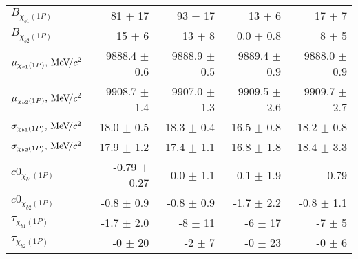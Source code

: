 \begin{table}[H]
{{\begin{tabular}{lrrrr}
\rule{0pt}{4ex}$B_{\chi_{b1}(1P)}$ & 81 $\pm$ 17 & 93 $\pm$ 17 & 13 $\pm$ 6 & 17 $\pm$ 7\\
$B_{\chi_{b2}(1P)}$ & 15 $\pm$ 6 & 13 $\pm$ 8 & 0.0 $\pm$ 0.8 & 8 $\pm$ 5\\

\rule{0pt}{4ex}$\mu_{\chi_{b1}(1P)}, {\mathrm{\,Me\kern -0.1em V\!/}c^2}$ & 9888.4 $\pm$ 0.6 & 9888.9 $\pm$ 0.5 & 9889.4 $\pm$ 0.9 & 9888.0 $\pm$ 0.9\\
$\mu_{\chi_{b2}(1P)}, {\mathrm{\,Me\kern -0.1em V\!/}c^2}$ & 9908.7 $\pm$ 1.4 & 9907.0 $\pm$ 1.3 & 9909.5 $\pm$ 2.6 & 9909.7 $\pm$ 2.7\\

\rule{0pt}{4ex}$\sigma_{\chi_{b1}(1P)}, {\mathrm{\,Me\kern -0.1em V\!/}c^2}$ & 18.0 $\pm$ 0.5 & 18.3 $\pm$ 0.4 & 16.5 $\pm$ 0.8 & 18.2 $\pm$ 0.8\\
$\sigma_{\chi_{b2}(1P)}, {\mathrm{\,Me\kern -0.1em V\!/}c^2}$ & 17.9 $\pm$ 1.2 & 17.4 $\pm$ 1.1 & 16.8 $\pm$ 1.8 & 18.4 $\pm$ 3.3\\

\rule{0pt}{4ex}$c0_{\chi_{b1}(1P)}$ & -0.79 $\pm$ 0.27 & -0.0 $\pm$ 1.1 & -0.1 $\pm$ 1.9 & -0.79\\
$c0_{\chi_{b2}(1P)}$ & -0.8 $\pm$ 0.9 & -0.8 $\pm$ 0.9 & -1.7 $\pm$ 2.2 & -0.8 $\pm$ 1.1\\

\rule{0pt}{4ex}$\tau_{\chi_{b1}(1P)}$ & -1.7 $\pm$ 2.0 & -8 $\pm$ 11 & -6 $\pm$ 17 & -7 $\pm$ 5\\
$\tau_{\chi_{b2}(1P)}$ & -0 $\pm$ 20 & -2 $\pm$ 7 & -0 $\pm$ 23 & -0 $\pm$ 6\\
\bottomrule
\end{tabular}
} %

} %
\label{tab:mc:chib1p_ups1s:fits}
\end{table}

